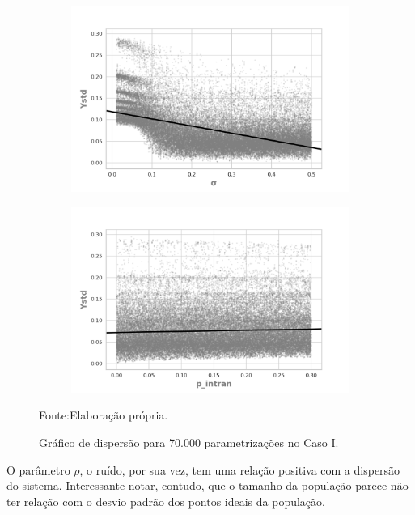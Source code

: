 \begin{figure}[H]
                \begin{subfigure}[b]{0.49\textwidth}
            \includegraphics[width=\textwidth]{ims/mutoregressions/regressionmutatingosigma.png}
          \end{subfigure}
                \begin{subfigure}[b]{0.49\textwidth}
            \includegraphics[width=\textwidth]{ims/mutoregressions/regressionmutatingop_intran.png}
    \end{subfigure}
    \caption{Gráfico de dispersão para 70.000 parametrizações no Caso I.}
    \label{fig:scatter1}
    Fonte:Elaboração própria.
\end{figure}


O parâmetro \(\rho\), o ruído, por sua vez, tem uma relação positiva com a
dispersão do sistema. Interessante notar, contudo, que o tamanho da população
parece não ter relação com o desvio padrão dos pontos ideais da população.


